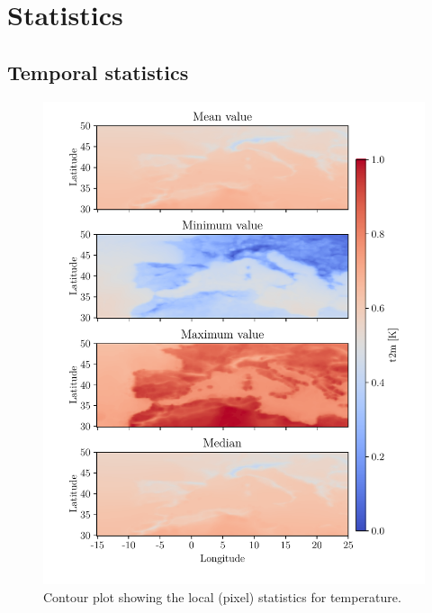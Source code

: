 \appendix
\chapter{Statistics} \label{ch:appendix_statistic}
\section{Temporal statistics} \label{sec:all_stats}
\begin{figure}[ht]
    \centering
    \includegraphics{python_figs/all_stat_variable_t2m.pdf}
    \caption{Contour plot showing the local (pixel) statistics for temperature.}
    \label{fig:all_stats_t2m}
\end{figure}

